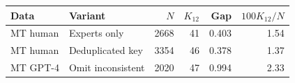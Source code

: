 \begin{tabular}{llrrrr}
\toprule
Data & Variant & $N$ & $K_{12}$ & Gap & $100K_{12}/N$ \\
\midrule
MT human & Experts only & 2668 & 41 & 0.403 & 1.54 \\
MT human & Deduplicated key & 3354 & 46 & 0.378 & 1.37 \\
MT GPT-4 & Omit inconsistent & 2020 & 47 & 0.994 & 2.33 \\
\bottomrule
\end{tabular}
